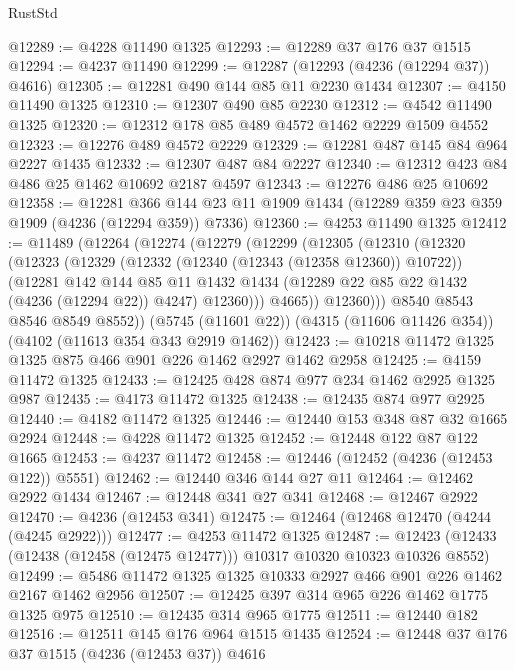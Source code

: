 \begin{lexlean}{RustStd}
\begin{coremodule}
@12289 := @4228 @11490 @1325
@12293 := @12289 @37 @176 @37 @1515
@12294 := @4237 @11490
@12299 := @12287 (@12293 (@4236 (@12294 @37)) @4616)
@12305 := @12281 @490 @144 @85 @11 @2230 @1434
@12307 := @4150 @11490 @1325
@12310 := @12307 @490 @85 @2230
@12312 := @4542 @11490 @1325
@12320 := @12312 @178 @85 @489 @4572 @1462 @2229 @1509 @4552
@12323 := @12276 @489 @4572 @2229
@12329 := @12281 @487 @145 @84 @964 @2227 @1435
@12332 := @12307 @487 @84 @2227
@12340 := @12312 @423 @84 @486 @25 @1462 @10692 @2187 @4597
@12343 := @12276 @486 @25 @10692
@12358 := @12281
    @366
    @144
    @23
    @11
    @1909
    @1434
    (@12289 @359 @23 @359 @1909 (@4236 (@12294 @359)) @7336)
@12360 := @4253 @11490 @1325
@12412 := @11489
    (@12264
      (@12274
        (@12279
          (@12299
            (@12305
              (@12310
                (@12320
                  (@12323
                    (@12329
                      (@12332 (@12340 (@12343 (@12358 @12360)) @10722))
                      (@12281
                        @142
                        @144
                        @85
                        @11
                        @1432
                        @1434
                        (@12289 @22 @85 @22 @1432 (@4236 (@12294 @22)) @4247)
                        @12360)))
                  @4665))
              @12360)))
        @8540
        @8543
        @8546
        @8549
        @8552))
    (@5745 (@11601 @22))
    (@4315 (@11606 @11426 @354))
    (@4102 (@11613 @354 @343 @2919 @1462))
@12423 := @10218 @11472 @1325 @1325 @875 @466 @901 @226 @1462 @2927 @1462 @2958
@12425 := @4159 @11472 @1325
@12433 := @12425 @428 @874 @977 @234 @1462 @2925 @1325 @987
@12435 := @4173 @11472 @1325
@12438 := @12435 @874 @977 @2925
@12440 := @4182 @11472 @1325
@12446 := @12440 @153 @348 @87 @32 @1665 @2924
@12448 := @4228 @11472 @1325
@12452 := @12448 @122 @87 @122 @1665
@12453 := @4237 @11472
@12458 := @12446 (@12452 (@4236 (@12453 @122)) @5551)
@12462 := @12440 @346 @144 @27 @11
@12464 := @12462 @2922 @1434
@12467 := @12448 @341 @27 @341
@12468 := @12467 @2922
@12470 := @4236 (@12453 @341)
@12475 := @12464 (@12468 @12470 (@4244 (@4245 @2922)))
@12477 := @4253 @11472 @1325
@12487 := @12423 (@12433 (@12438 (@12458 (@12475 @12477))) @10317 @10320 @10323 @10326 @8552)
@12499 := @5486 @11472 @1325 @1325 @10333 @2927 @466 @901 @226 @1462 @2167 @1462 @2956
@12507 := @12425 @397 @314 @965 @226 @1462 @1775 @1325 @975
@12510 := @12435 @314 @965 @1775
@12511 := @12440 @182
@12516 := @12511 @145 @176 @964 @1515 @1435
@12524 := @12448 @37 @176 @37 @1515 (@4236 (@12453 @37)) @4616

\end{coremodule}
\end{lexlean}
